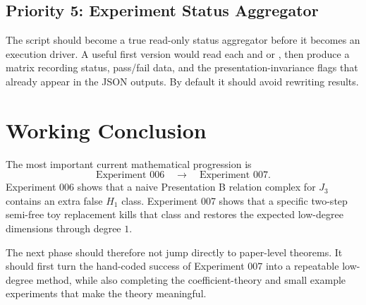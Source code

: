 \documentclass[11pt]{report}
\theoremstyle{definition}
\theoremstyle{plain}
\begin{document}
\subsection*{Priority 5: Experiment Status Aggregator}

The script  should become a true
read-only status aggregator before it becomes an execution driver. A useful
first version would read each  and  or
, then produce a matrix recording status, pass/fail data, and
the presentation-invariance flags that already appear in the JSON outputs. By
default it should avoid rewriting results.

\section{Working Conclusion}

The most important current mathematical progression is
\[
  \text{Experiment 006}
  \quad\longrightarrow\quad
  \text{Experiment 007}.
\]
Experiment 006 shows that a naive Presentation B relation complex for \(J_3\)
contains an extra false \(H_1\) class. Experiment 007 shows that a specific
two-step semi-free toy replacement kills that class and restores the expected
low-degree dimensions through degree \(1\).

The next phase should therefore not jump directly to paper-level theorems. It
should first turn the hand-coded success of Experiment 007 into a repeatable
low-degree method, while also completing the coefficient-theory and small
example experiments that make the theory meaningful.

\appendix

\end{document}
